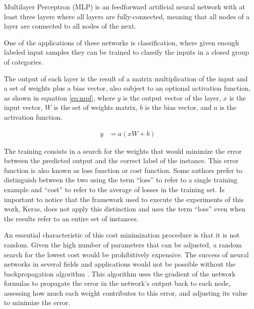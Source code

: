 Multilayer Perceptron (MLP)\cite{rosenblatt_perceptron:_1958} is an feedforward artificial neural network with at least three layers where all layers are fully-connected, meaning that all nodes of a layer are connected to all nodes of the next.

One of the applications of these networks is classification, where given enough labeled input samples they can be trained to classify the inputs in a closed group of categories.

The output of each layer is the result of a matrix multiplication of the input and a set of weights plus a bias vector, also subject to an optional activation function, as shown in equation \ref{eq:mpl}, where $y$ is the output vector of the layer, $x$ is the input vector, $W$ is the set of weights matrix, $b$ is the bias vector, and $a$ is the activation function.

\begin{align}
\label{eq:mpl}     
y &= a(x W + b)
\end{align}


The training consists in a search for the weights that would minimize the error between the predicted output and the correct label of the instance. This error function is also known as loss function or cost function. Some authors prefer to distinguish between the two using the term ``loss'' to refer to a single training example and ``cost'' to refer to the average of losses in the training set. Is important to notice that the framework used to execute the experiments of this work, Keras, does not apply this distinction and uses the term ``loss'' even when the results refer to an entire set of instances.

An essential characteristic of this cost minimization procedure is that it is not random. Given the high number of parameters that can be adjusted, a random search for the lowest cost would be prohibitively expensive. The success of neural networks in several fields and applications would not be possible without the backpropagation algorithm \cite{rumelhart_general_1986}. This algorithm uses the gradient of the network formulas to propagate the error in the network's output back to each node, assessing how much each weight contributes to this error, and adjusting its value to minimize the error.